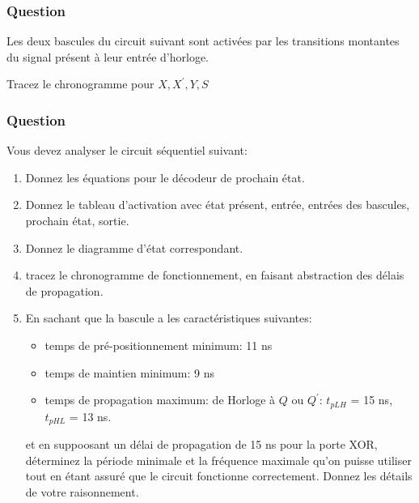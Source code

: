 \documentclass[11pt]{article}
\begin{document}
\subsubsection*{Question}
\label{sec:orga783830}
Les deux bascules du circuit suivant sont activées par les
   transitions montantes du signal présent à leur entrée
   d'horloge. 
   \begin{center}

\end{center}

Tracez le chronogramme pour \(X, X^\prime, Y, S\)

\subsubsection*{Question}
\label{sec:org2d4161e}
Vous devez analyser le circuit séquentiel suivant:
\begin{center}

\end{center}

\begin{enumerate}
\item Donnez les équations pour le décodeur de prochain état.

\item Donnez le tableau d'activation avec état présent, entrée, entrées
des bascules, prochain état, sortie.

\item Donnez le diagramme d'état correspondant.

\item tracez le chronogramme de fonctionnement, en
faisant abstraction des délais de propagation.

\item En sachant que la bascule a les caractéristiques suivantes:

\begin{itemize}
\item temps de pré-positionnement minimum: 11 ns

\item temps de maintien minimum: 9 ns

\item temps de propagation maximum: de Horloge à \(Q\) ou
\(Q^{\prime}\): \(t_{pLH}\) = 15 ns, \(t_{pHL}\) = 13 ns.
\end{itemize}

et en suppoosant un délai de propagation de 15 ns pour la porte
XOR, déterminez la période minimale et la fréquence
maximale qu'on puisse utiliser tout en étant assuré que le circuit
fonctionne correctement. Donnez les détails de votre raisonnement.
\end{enumerate}
\end{document}
